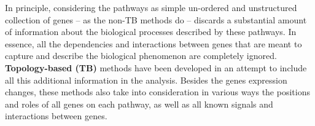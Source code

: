 \documentclass[Minh_PhD_thesis.tex]{subfiles}
\begin{document}
\begin{itemize}
\end{itemize}

 


In principle, considering the pathways as simple un-ordered and unstructured collection of genes -- as the non-TB methods do -- discards a substantial amount of information about the biological processes described by these pathways. In essence, all the dependencies and interactions between genes that are meant to capture and describe the biological phenomenon are completely ignored. 
 \textbf{Topology-based (TB)} methods have been developed in an attempt to include all this additional information in the analysis.
Besides the genes expression changes, these methods  also take into consideration in various ways the positions and roles of all genes on each pathway, as well as all known signals and interactions between genes. 
\end{document}
